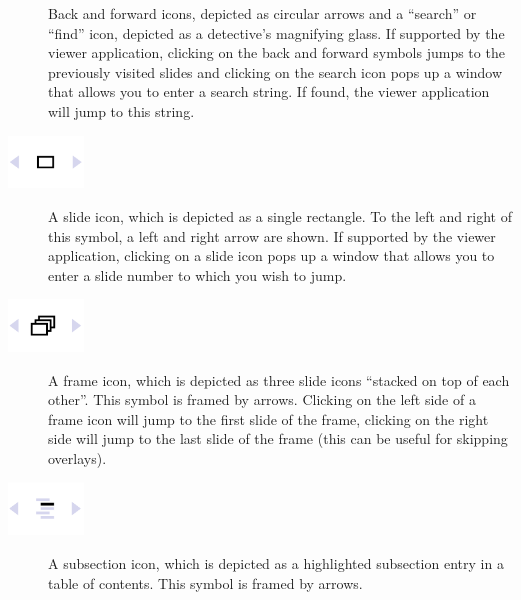 \begin{warpprint}
\begin{description}
\item[{\makebox[0.7cm][l]{\insertbackfindforwardnavigationsymbol}}]
  Back and forward icons, depicted as circular arrows and a ``search'' or ``find'' icon, depicted as a detective's magnifying glass.\newline
  If supported by the viewer application, clicking on the back and forward symbols jumps to the previously visited slides and clicking on the search icon pops up a window that allows you to enter a search string. If found, the viewer application will jump to this string.
\end{description}
\end{warpprint}

\begin{warpHTML}
\begin{description}
\item[{\mbox{\includegraphics[width=2cm]{navigation-symbols/slidenavigationsymbol.png}}}]
  A slide icon, which is depicted as a single rectangle. To the left and right of this symbol, a left and right arrow are shown.\newline
  If supported by the viewer application, clicking on a slide icon pops up a window that allows you to enter a slide number to which you wish to jump.
\item[{\mbox{\includegraphics[width=2cm]{navigation-symbols/framenavigationsymbol.png}}}]
  A frame icon, which is depicted as three slide icons ``stacked on top of each other''. This symbol is framed by arrows.\newline
  Clicking on the left side of a frame icon will jump to the first slide of the frame, clicking on the right side will jump to the last slide of the frame (this can be useful for skipping overlays).
\item[{\mbox{\includegraphics[width=2cm]{navigation-symbols/subsectionnavigationsymbol.png}}}]
  A subsection icon, which is depicted as a highlighted subsection entry in a table of contents. This symbol is framed by arrows.\newline

\end{description}
\end{warpHTML}
